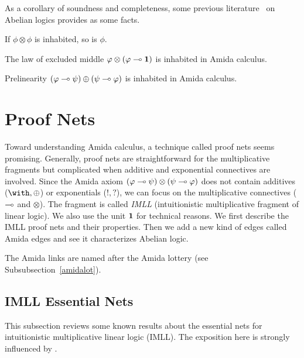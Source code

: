 As a corollary of soundness and completeness,
some previous literature~\citet{meyer-slaney-1989,casari1989} on
Abelian logics provides as some facts.
\begin{corollary}
 If $\phi\otimes\phi$ is inhabited, so is $\phi$.
\end{corollary}
\begin{corollary}
 The law of excluded middle $\varphi\otimes(\varphi\multimap \mathbf{1})$ is inhabited
 in Amida calculus.
\end{corollary}
\begin{corollary}
 Prelinearity $(\varphi\multimap\psi)\oplus(\psi\multimap\varphi)$ is
 inhabited in Amida calculus.
\end{corollary}

\section{Proof Nets}
\label{sec:proofnets}

Toward understanding Amida calculus, a technique called proof nets seems
promising.
Generally, proof nets are straightforward for the multiplicative
fragments but complicated when additive and exponential connectives are
involved.
Since the Amida axiom $(\varphi\multimap\psi)\otimes(\psi\multimap\varphi)$
does not contain additives ($\with,\oplus$) or exponentials ($!,?$),
we can focus on the multiplicative connectives ($\multimap$ and $\otimes$).
The fragment is called \textit{IMLL} (intuitionistic multiplicative fragment of
linear logic).  We also use the unit $\mathbf{1}$ for technical reasons.
We first describe the IMLL proof nets and their properties.
Then we add a new kind of edges called Amida edges and see it
characterizes Abelian logic.

The Amida links are named after the Amida lottery (see
Subsubsection~\ref{amidalot}).

\subsection{IMLL Essential Nets}

This subsection reviews some known results about the essential
nets for
intuitionistic multiplicative linear logic
(IMLL). The exposition here is strongly
influenced by \citet{murawski2003}.

